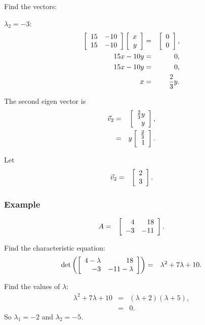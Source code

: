 \begin{frame}
  Find the vectors:

  $\lambda_2 = -3$:
  \begin{eqnarray*}
    \left[ \begin{array}{rr} 15 & -10 \\ 15 & -10 \end{array} \right] \left[ \begin{array}{r} x \\ y \end{array} \right] & = & \left[ \begin{array}{r} 0 \\ 0 \end{array} \right], \\
    15x - 10y & = & 0, \\
    15x - 10y & = & 0, \\
    x & = & \frac{2}{3} y.
  \end{eqnarray*}

  The second eigen vector is 
  \begin{eqnarray*}
    \vec{v}_2 & = & \left[ \begin{array}{r} \frac{2}{3}y \\ y \end{array} \right], \\
    & = & y \left[ \begin{array}{r} \frac{2}{3} \\ 1 \end{array} \right].
  \end{eqnarray*}

  Let
  \begin{eqnarray*}
    \vec{v}_2 & = & \left[ \begin{array}{r} 2 \\ 3 \end{array} \right].
  \end{eqnarray*}

\end{frame}






\begin{frame}
  \frametitle{Example}

  \begin{eqnarray*}
    A & = & \left[ \begin{array}{rr} 4 & 18 \\ -3 & -11 \end{array} \right].
  \end{eqnarray*}

  Find the characteristic equation:
  \begin{eqnarray*}
    \det\left(\left[ \begin{array}{rr} 4-\lambda & 18 \\ -3 & -11-\lambda \end{array} \right]\right) & = & \lambda^2+7\lambda+10.
  \end{eqnarray*}

  Find the values of $\lambda$:
  \begin{eqnarray*}
    \lambda^2+7\lambda+10 & = & (\lambda+2)(\lambda+5), \\
    & = & 0.
  \end{eqnarray*}
  So $\lambda_1 = -2$ and $\lambda_2=-5$.


\end{frame}


